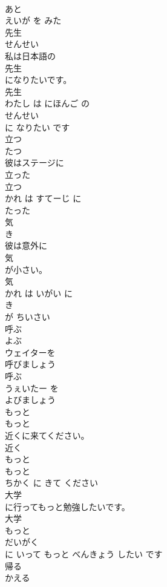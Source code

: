\documentclass[8pt]{extreport}
\begin{document}
\begin{CJK}{UTF8}{min}
\\	あと
\\	えいが を みた	
\\	先生	
\\	せんせい	
\\	私は日本語の
\\	先生
\\	になりたいです。	
\\	先生 
\\	わたし は にほんご の 
\\	せんせい
\\	に なりたい です	
\\	立つ	
\\	たつ	
\\	彼はステージに
\\	立った
\\	立つ 
\\	かれ は すてーじ に 
\\	たった
\\	気	
\\	き	
\\	彼は意外に
\\	気
\\	が小さい。	
\\	気 
\\	かれ は いがい に 
\\	き
\\	が ちいさい	
\\	呼ぶ	
\\	よぶ	
\\	ウェイターを
\\	呼びましょう
\\	呼ぶ 
\\	うぇいたー を 
\\	よびましょう
\\	もっと	
\\	もっと
\\	近くに来てください。	
\\	近く 
\\	もっと 
\\	もっと
\\	ちかく に きて ください	
\\	大学
\\	に行ってもっと勉強したいです。	
\\	大学 
\\	もっと 
\\	だいがく
\\	に いって もっと べんきょう したい です	
\\	帰る	
\\	かえる	

\end{CJK}
\end{document}
